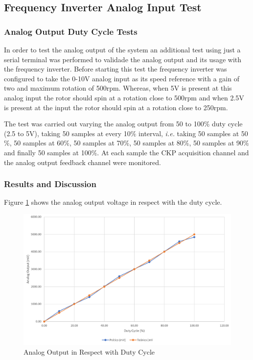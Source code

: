 \subsection{Frequency Inverter Analog Input Test}\label{ssec:frequency-inverter-analog-input-test}
	
	\subsubsection{Analog Output Duty Cycle Tests}\label{sec:duty-cycle-test}

		In order to test the analog output of the system an additional test using just a serial terminal was performed to validade the analog output and its usage with the frequency inverter. Before starting this test the frequency inverter was configured to take the 0-10V analog input as its speed reference with a gain of two and maximum rotation of 500rpm. Whereas, when 5V is present at this analog input the rotor should spin at a rotation close to 500rpm and when 2.5V is present at the input the rotor should spin at a rotation close to 250rpm.
		\par
		The test was carried out varying the analog output from 50 to 100$\%$ duty cycle (2.5 to 5V), taking 50 samples at every 10$\%$ interval, \textit{i.e.} taking 50 samples at 50$\%$, 50 samples at 60$\%$, 50 samples at 70$\%$, 50 samples at 80$\%$, 50 samples at 90$\%$ and finally 50 samples at 100$\%$. At each sample the CKP acquisition channel and the analog output feedback channel were monitored.
	
	\subsubsection{Results and Discussion}\label{sec:duty-cycle-test-results}
		Figure \ref{fig:test-analog-voltage} shows the analog output voltage in respect with the duty cycle.

		\begin{figure}[htbp]
				\centering
				\includegraphics[width=1\textwidth]{figuras/fig-test-analog-voltage}
				\caption{Analog Output in Respect with Duty Cycle}
				\label{fig:test-analog-voltage}
		\end{figure}

